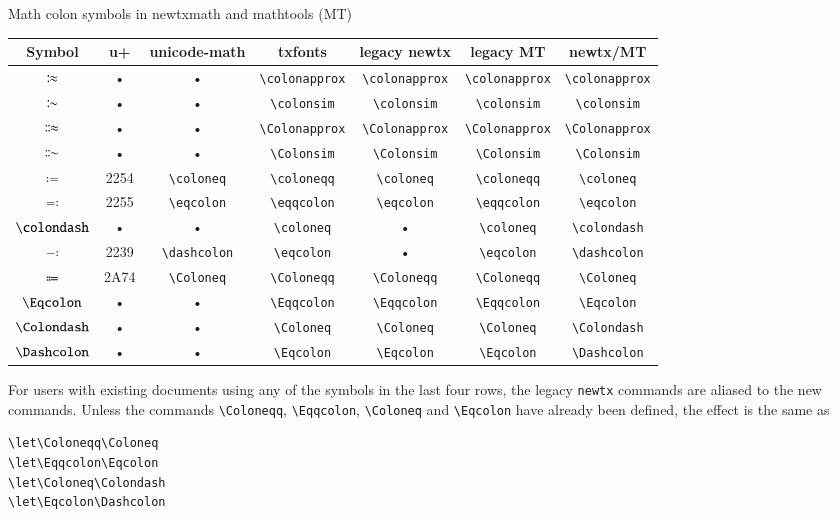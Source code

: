\documentclass[\fsc]{article}
\theoremstyle{oldplain}
\theoremstyle{plain}
\begin{document}
\begin{center}Math colon symbols in newtxmath and mathtools (MT)\\ \vspace{6pt}
  \begin{tabular}{@{} ccccccc @{}}
    \toprule
    Symbol &  u+ & unicode-math & txfonts &  legacy newtx & legacy MT & newtx/MT \\ 
    \midrule
    $\colonapprox$ &  • & • & \verb|\colonapprox| & \verb|\colonapprox| & \verb|\colonapprox| & \verb|\colonapprox| \\ 
     $\colonsim$ &  • & •  & \verb|\colonsim| &  \verb|\colonsim| & \verb|\colonsim| & \verb|\colonsim|  \\ 
    $\Colonapprox$ &  • & • & \verb|\Colonapprox| &  \verb|\Colonapprox| & \verb|\Colonapprox| & \verb|\Colonapprox| \\ 
    $\Colonsim$ &  • & •  & \verb|\Colonsim| & \verb|\Colonsim| &  \verb|\Colonsim| & \verb|\Colonsim| \\ 
    $\coloneq$ &  2254 & \verb|\coloneq|  &\verb|\coloneqq| & \verb|\coloneq| & \verb|\coloneqq| & \verb|\coloneq| \\ 
    $\eqcolon$ &  2255 & \verb|\eqcolon|  &\verb|\eqqcolon| &  \verb|\eqcolon| & \verb|\eqqcolon| & \verb|\eqcolon| \\ 
    $\colondash$ &  • & •  &\verb|\coloneq| & • &  \verb|\coloneq| & \verb|\colondash| \\ 
    $\dashcolon$ &  2239 & \verb|\dashcolon|  &\verb|\eqcolon| &  • & \verb|\eqcolon| & \verb|\dashcolon| \\ 
    $\Coloneq$ &  2A74 & \verb|\Coloneq|  & \verb|\Coloneqq| & \verb|\Coloneqq| & \verb|\Coloneqq| & \verb|\Coloneq| \\ 
    $\Eqcolon$ &  • & •  &\verb|\Eqqcolon| &  \verb|\Eqqcolon| & \verb|\Eqqcolon| & \verb|\Eqcolon| \\ 
    $\Colondash$ &  • & •  & \verb|\Coloneq| & \verb|\Coloneq| & \verb|\Coloneq| & \verb|\Colondash| \\ 
    $\Dashcolon$ &  • & •  & \verb|\Eqcolon| & \verb|\Eqcolon| & \verb|\Eqcolon| & \verb|\Dashcolon| \\ 
    \bottomrule
  \end{tabular}
\end{center}


For users with existing documents using any of the symbols in the last four rows, the legacy {\tt newtx} commands are aliased to the new commands. Unless the commands \verb|\Coloneqq|, \verb|\Eqqcolon|, \verb|\Coloneq| and \verb|\Eqcolon| have already been defined, the effect is the same as 
\begin{verbatim}
\let\Coloneqq\Coloneq
\let\Eqqcolon\Eqcolon
\let\Coloneq\Colondash
\let\Eqcolon\Dashcolon
\end{verbatim}
\end{document}
